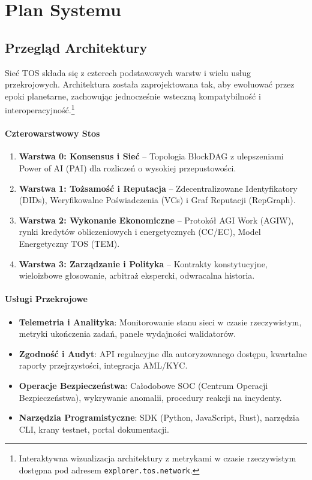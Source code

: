 \documentclass[11pt]{article}
\begin{document}
\section{Plan Systemu}
\subsection{Przegląd Architektury}
Sieć TOS składa się z czterech podstawowych warstw i wielu usług przekrojowych. Architektura została zaprojektowana tak, aby ewoluować przez epoki planetarne, zachowując jednocześnie wsteczną kompatybilność i interoperacyjność.\footnote{Interaktywna wizualizacja architektury z metrykami w czasie rzeczywistym dostępna pod adresem \texttt{explorer.tos.network}.}

\paragraph{Czterowarstwowy Stos}
\begin{enumerate}[noitemsep]
  \item \textbf{Warstwa 0: Konsensus i Sieć} -- Topologia BlockDAG z ulepszeniami Power of AI (PAI) dla rozliczeń o wysokiej przepustowości.
  \item \textbf{Warstwa 1: Tożsamość i Reputacja} -- Zdecentralizowane Identyfikatory (DIDs), Weryfikowalne Poświadczenia (VCs) i Graf Reputacji (RepGraph).
  \item \textbf{Warstwa 2: Wykonanie Ekonomiczne} -- Protokół AGI Work (AGIW), rynki kredytów obliczeniowych i energetycznych (CC/EC), Model Energetyczny TOS (TEM).
  \item \textbf{Warstwa 3: Zarządzanie i Polityka} -- Kontrakty konstytucyjne, wieloizbowe głosowanie, arbitraż ekspercki, odwracalna historia.
\end{enumerate}

\paragraph{Usługi Przekrojowe}
\begin{itemize}[noitemsep]
  \item \textbf{Telemetria i Analityka}: Monitorowanie stanu sieci w czasie rzeczywistym, metryki ukończenia zadań, panele wydajności walidatorów.
  \item \textbf{Zgodność i Audyt}: API regulacyjne dla autoryzowanego dostępu, kwartalne raporty przejrzystości, integracja AML/KYC.
  \item \textbf{Operacje Bezpieczeństwa}: Całodobowe SOC (Centrum Operacji Bezpieczeństwa), wykrywanie anomalii, procedury reakcji na incydenty.
  \item \textbf{Narzędzia Programistyczne}: SDK (Python, JavaScript, Rust), narzędzia CLI, krany testnet, portal dokumentacji.
\end{itemize}
\end{document}
